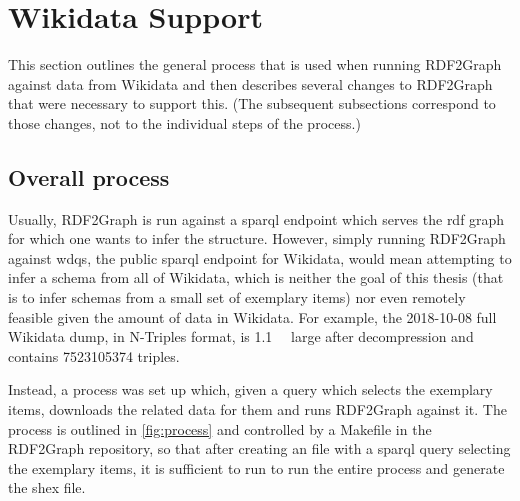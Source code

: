 \section{Wikidata Support}
\label{sec:RDF2Graph+Wikidata:Wikidata}

This section outlines the general process that is used when running \gls{RDF2Graph} against data from \gls{Wikidata}
and then describes several changes to \gls{RDF2Graph} that were necessary to support this.
(The subsequent subsections correspond to those changes, not to the individual steps of the process.)

\subsection{Overall process}
\label{subsec:RDF2Graph+Wikidata:Wikidata:download}

Usually, \gls{RDF2Graph} is run against a \gls{sparql} endpoint
which serves the \gls{rdf} graph for which one wants to infer the structure.
However, simply running \gls{RDF2Graph} against \acrfull{wdqs}, the public \gls{sparql} endpoint for \gls{Wikidata},
would mean attempting to infer a \gls{schema} from all of \gls{Wikidata},
which is neither the goal of this thesis
(that is to infer \glspl{schema} from a small set of exemplary \glspl{item})
nor even remotely feasible given the amount of data in \gls{Wikidata}.
For example, the 2018-10-08 full \gls{Wikidata} dump, in \gls{N-Triples} format,
is \SI{1.1}{\tera\byte} large after decompression %
and contains \num{7523105374} triples.

Instead, a process was set up which,
given a query which selects the exemplary \glspl{item},
downloads the related data for them and runs \gls{RDF2Graph} against it.
The process is outlined in \cref{fig:process}
and controlled by a Makefile in the \gls{RDF2Graph} repository,
so that after creating an  file
with a \gls{sparql} query selecting the exemplary items,
it is sufficient to run 
to run the entire process and generate the \gls{shex} file.

